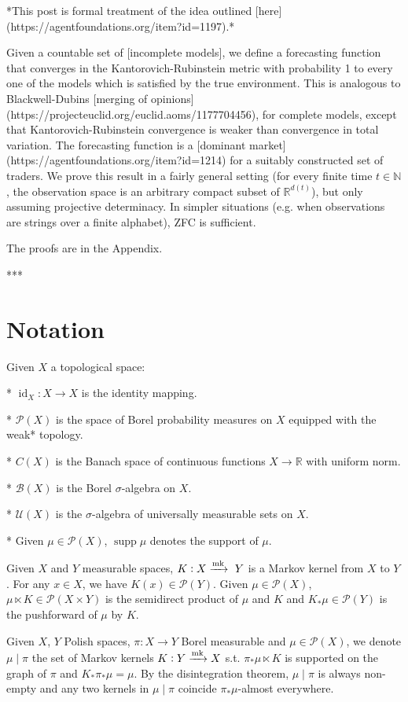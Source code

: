\documentclass[a4paper]{article}
\DeclareMathOperator{\Supp}{supp}
\newcommand{\Nats}{\mathbb{N}}
\newcommand{\Reals}{\mathbb{R}}
\newcommand{\Markov}{\xrightarrow{\textnormal{mk}}}
\newcommand{\Prob}{\mathcal{P}}
\newcommand{\UM}{\mathcal{U}}
\newcommand{\I}{\operatorname{id}}
\begin{document}
*This post is formal treatment of the idea outlined [here](https://agentfoundations.org/item?id=1197).*

Given a countable set of [incomplete models], we define a forecasting function that converges in the Kantorovich-Rubinstein metric with probability 1 to every one of the models which is satisfied by the true environment. This is analogous to Blackwell-Dubins [merging of opinions](https://projecteuclid.org/euclid.aoms/1177704456), for complete models, except that Kantorovich-Rubinstein convergence is weaker than convergence in total variation. The forecasting function is a [dominant market](https://agentfoundations.org/item?id=1214) for a suitably constructed set of traders. We prove this result in a fairly general setting (for every finite time $t \in \Nats$, the observation space is an arbitrary compact subset of $\Reals^{d(t)}$), but only assuming projective determinacy. In simpler situations (e.g. when observations are strings over a finite alphabet), ZFC is sufficient.

The proofs are in the Appendix.

***

\section{Notation}

Given ${X}$ a topological space:

* ${\I_X: X \rightarrow X}$ is the identity mapping.

* ${\Prob(X)}$ is the space of Borel probability measures on ${X}$ equipped with the weak* topology.

* ${C(X)}$ is the Banach space of continuous functions ${X \rightarrow \Reals}$ with uniform norm.

* ${\mathcal{B}}(X)$ is the Borel ${\sigma}$-algebra on ${X}$.

* ${\UM(X)}$ is the ${\sigma}$-algebra of universally measurable sets on ${X}$.

* Given ${\mu \in \Prob(X)}$, ${\Supp \mu}$ denotes the support of ${\mu}$. 

Given ${X}$ and ${Y}$ measurable spaces, ${K: X \Markov\ Y}$ is a Markov kernel from ${X}$ to ${Y}$. For any ${x \in X}$, we have ${K(x) \in \Prob(Y)}$. Given ${\mu \in \Prob(X)}$, ${\mu \ltimes K \in \Prob(X \times Y)}$ is the semidirect product of ${\mu}$ and ${K}$ and ${K_*\mu \in \Prob(Y)}$ is the pushforward of ${\mu}$ by ${K}$.

Given ${X}$, ${Y}$ Polish spaces, ${\pi: X \rightarrow Y}$ Borel measurable and ${\mu \in \Prob(X)}$, we denote ${\mu \mid \pi}$ the set of Markov kernels ${K: Y \Markov X}$ s.t. ${\pi_* \mu \ltimes K}$ is supported on the graph of ${\pi}$ and ${K_*\pi_* \mu = \mu}$. By the disintegration theorem, ${\mu \mid \pi}$ is always non-empty and any two kernels in ${\mu \mid \pi}$ coincide ${\pi_*\mu}$-almost everywhere.
\end{document}
